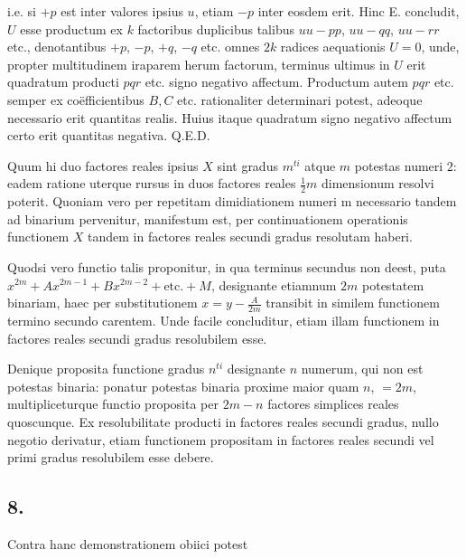 \documentclass[14pt]{memoir}
\theoremstyle{plain}
\theoremstyle{remark}
\begin{document}
i.e. si \(+p\) est inter valores ipsius \(u\), etiam \(-p\) inter eosdem erit. Hinc \textsc{E.} concludit, \(U\) esse productum ex \(k\) factoribus duplicibus talibus \(uu - pp\), \(uu - qq\), \(uu - rr\) etc., denotantibus \(+p\), \(-p\), \(+q\), \(-q\) etc. omnes \(2k\) radices aequationis \(U=0\),  unde, propter multitudinem iraparem herum factorum, terminus ultimus in \(U\) erit quadratum producti \(pqr\) etc. signo negativo affectum. Productum autem \(pqr\) etc. semper ex co\"efficientibus \(B, C\) etc. rationaliter determinari potest, adeoque necessario erit quantitas realis. Huius itaque quadratum signo negativo affectum certo erit quantitas negativa.   Q.E.D.

Quum hi duo factores reales ipsius \(X\) sint gradus \(m^{ti}\) atque \(m\) potestas numeri \(2\): eadem ratione uterque rursus in duos factores reales \(\tfrac{1}{2}m\) dimensionum resolvi poterit. Quoniam vero per repetitam dimidiationem numeri m necessario tandem ad binarium pervenitur, manifestum est, per continuationem operationis functionem \(X\) tandem in factores reales secundi gradus resolutam haberi.

Quodsi vero functio talis proponitur, in qua terminus secundus non deest, puta \(x^{2m} + A x^{2m-1} + B x^{2m-2} + \text{etc.} + M\), designante etiamnum \(2m\) potestatem binariam, haec per substitutionem \(x = y - \frac{A}{2m}\) transibit in similem functionem termino secundo carentem. Unde facile concluditur, etiam illam functionem in factores reales secundi gradus resolubilem esse.

Denique proposita functione gradus \(n^{ti}\) designante \(n\) numerum, qui non est potestas binaria: ponatur potestas binaria proxime maior quam \(n\), \(= 2m\), multipliceturque functio proposita per \(2 m - n\) factores simplices reales quoscunque. Ex resolubilitate producti in factores reales secundi gradus, nullo negotio derivatur, etiam functionem propositam in factores reales secundi vel primi gradus resolubilem esse debere.

\subsection*{8.}

Contra hanc demonstrationem obiici potest
\end{document}
